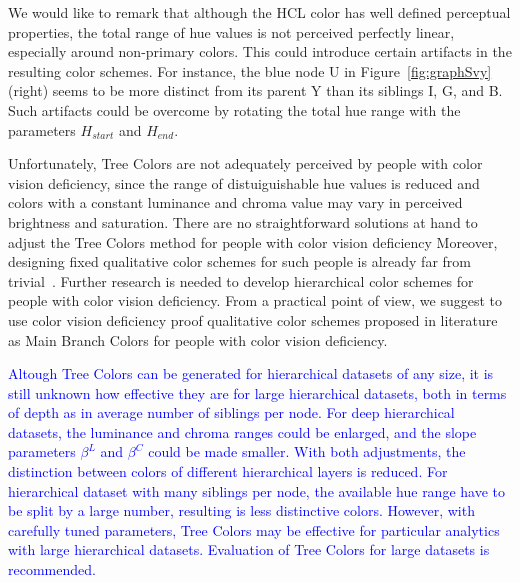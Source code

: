 \documentclass[review,journal]{vgtc}         %
\newcommand{\changedM}[1]{\textcolor{blue}{#1}}
\begin{document}
We would like to remark that although the HCL color has well defined perceptual properties, the total range of hue values is not perceived perfectly linear, especially around non-primary colors. This could introduce certain artifacts in the resulting color schemes. For instance, the blue node U in Figure~\ref{fig:graphSvy} (right) seems to be more distinct from its parent Y than its siblings I, G, and B. Such artifacts could be overcome by rotating the total hue range with the parameters $H_{start}$ and $H_{end}$.

Unfortunately, Tree Colors are not adequately perceived by people with color vision deficiency, since the range of distuiguishable hue values is reduced and colors with a constant luminance and chroma value may vary in perceived brightness and saturation. There are no straightforward solutions at hand to adjust the Tree Colors method for people with color vision deficiency Moreover, designing fixed qualitative color schemes for such people is already far from trivial~\cite{okabe02}. Further research is needed to develop hierarchical color schemes for people with color vision deficiency. From a practical point of view, we suggest to use color vision deficiency proof qualitative color schemes proposed in literature~\cite{okabe02, brewer03} as Main Branch Colors for people with color vision deficiency.

\changedM{Altough Tree Colors can be generated for hierarchical datasets of any size, it is still unknown how effective they are for large hierarchical datasets, both in terms of depth as in average number of siblings per node. For deep hierarchical datasets, the luminance and chroma ranges could be enlarged, and the slope parameters $\beta^{L}$ and $\beta^{C}$ could be made smaller. With both adjustments, the distinction between colors of different hierarchical layers is reduced. For hierarchical dataset with many siblings per node, the available hue range have to be split by a large number, resulting is less distinctive colors. However, with carefully tuned parameters, Tree Colors may be effective for particular analytics with large hierarchical datasets. Evaluation of Tree Colors for large datasets is recommended.}





\end{document}
